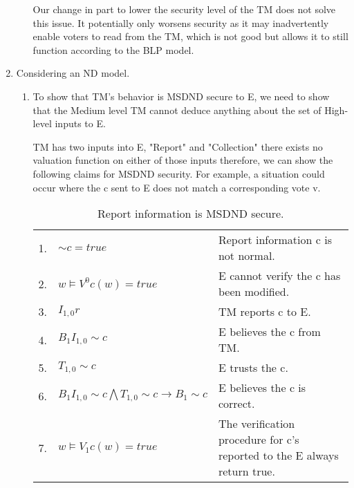 \documentclass[journal,onecolumn]{IEEEtran}
\begin{document}
\begin{enumerate}
\begin{enumerate}
      Our change in part to lower the security level of the TM does not solve this issue. It potentially only worsens security as it may inadvertently enable voters to read from the TM, which is not good but allows it to still function according to the BLP model. 
    \end{enumerate}

  \item Considering an ND model. 
    \begin{enumerate}
      \item To show that TM's behavior is MSDND secure to E, we need to show that the Medium level TM cannot deduce anything about the set of High-level inputs to E.
      
      TM has two inputs into E, "Report" and "Collection" there exists no valuation function on either of those inputs therefore, we can show the following claims for MSDND security. For example, a situation could occur where the c sent to E does not match a corresponding vote v. 
      
      \begin{table}[H]
        \caption{Report information is MSDND secure.}
        \centering
        \begin{tabular}{lll}
        1.  & ${\sim} c = true$                                                     & Report information c is not normal.                                                       \\
        2.  & $w \vDash V^0 c(w) = true$                                            & E cannot verify the c has been modified.                                 \\
        3.  & $I_{1,0}r$                                                              & TM reports c to E.                                                \\
        4.  & $B_1I_{1,0} {\sim} c$                                                   & E believes the c from TM.                                     \\
        5.  & $T_{1,0} {\sim} c$                                                      & E trusts the c.                                                          \\
        6.  & $B_1I_{1,0} {\sim} c \bigwedge T_{1,0} {\sim} c \rightarrow B_1 {\sim} c$ & E believes the c is correct.                                             \\
        7. & $w \vDash V_1 c(w) = true$                                             & The verification procedure for c's reported to the E always return true.
        \end{tabular}
      \end{table}


\end{enumerate}
\end{enumerate}
\end{document}
